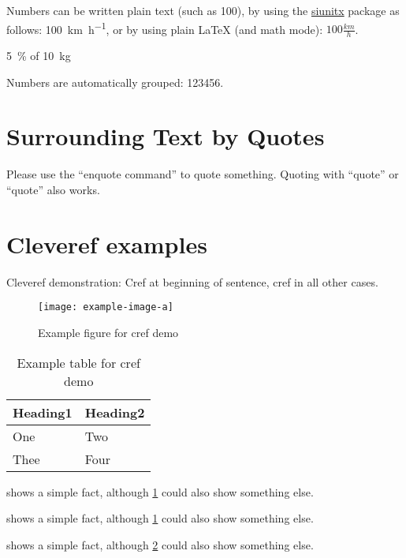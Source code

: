 \documentclass[
  numbers=noenddot,
  english,  %
  a4paper,  %
  twoside,  %
  bibliography=totoc,
  headsepline,
  cleardoublepage=empty,
  parskip=half,
  draft=false
]{scrbook}
\theoremstyle{break}
\begin{document}
\begin{ltgexample}
Numbers can be written plain text (such as 100), by using the \href{https://ctan.org/pkg/siunitx}{siunitx} package as follows:
\SI{100}{\km\per\hour},
or by using plain \LaTeX{} (and math mode):
$100 \frac{\mathit{km}}{h}$.
\end{ltgexample}

\begin{ltgexample}
\SI{5}{\percent} of \SI{10}{kg}
\end{ltgexample}

\begin{ltgexample}
Numbers are automatically grouped: \num{123456}.
\end{ltgexample}

\section{Surrounding Text by Quotes}

\begin{ltgexample}
Please use the \enquote{enquote command} to quote something.
Quoting with "`quote"' or ``quote'' also works.

\end{ltgexample}

\section{Cleveref examples}
\label{sec:ex:cref}

Cleveref demonstration: Cref at beginning of sentence, cref in all other cases.

\begin{figure}
  \centering
  \texttt{[image: example-image-a]}
  \caption{Example figure for cref demo}
  \label{fig:ex:cref}
\end{figure}

\begin{table}
  \centering
  \begin{tabular}{ll}
    \toprule
    Heading1 & Heading2 \\
    \midrule
    One      & Two      \\
    Thee     & Four     \\
    \bottomrule
  \end{tabular}
  \caption{Example table for cref demo}
  \label{tab:ex:cref}
\end{table}

\begin{ltgexample}
 shows a simple fact, although \cref{fig:ex:cref} could also show something else.

 shows a simple fact, although \cref{tab:ex:cref} could also show something else.

 shows a simple fact, although \cref{sec:ex:cref} could also show something else.
\end{ltgexample}
\end{document}
